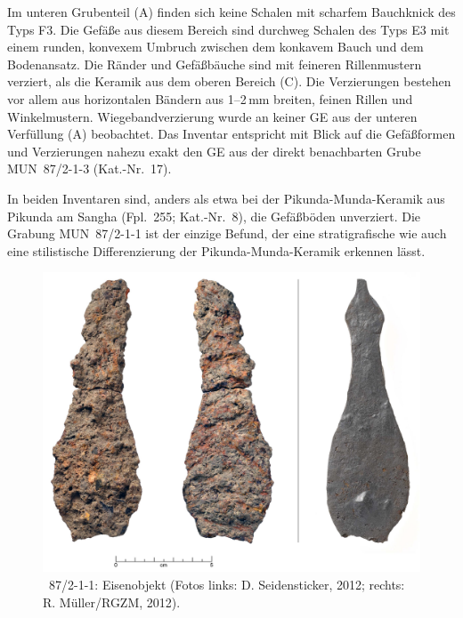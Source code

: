 Im unteren Grubenteil (A) finden sich keine Schalen mit scharfem Bauchknick des Typs F3. Die Gefäße aus diesem Bereich sind durchweg Schalen des Typs E3 mit einem runden, konvexem Umbruch zwischen dem konkavem Bauch und dem Bodenansatz. Die Ränder und Gefäßbäuche sind mit feineren Rillenmustern verziert, als die Keramik aus dem oberen Bereich (C). Die Verzierungen bestehen vor allem aus horizontalen Bändern aus 1--2\,mm breiten, feinen Rillen und Winkelmustern. Wiegebandverzierung wurde an keiner GE aus der unteren Verfüllung (A) beobachtet. Das Inventar entspricht mit Blick auf die Gefäßformen und Verzierungen nahezu exakt den GE aus der direkt benachbarten Grube MUN~87/2-1-3 (Kat.-Nr.~17).

In beiden Inventaren sind, anders als etwa bei der Pikunda-Munda-Keramik aus Pikunda am \mbox{Sangha} (Fpl.~255; Kat.-Nr.~8), die Gefäßböden unverziert. Die Grabung MUN~87/2-1-1 ist der einzige Befund, der eine stratigrafische wie auch eine stilistische Differenzierung der Pikunda-Munda-Keramik erkennen lässt.

\begin{figure}[p]
	\begin{minipage}[b]{.66\textwidth}
		\includegraphics[width = \textwidth]{fig/MUN87-211-2_Eisengeld.jpg}
	\end{minipage}\hfill
	\begin{minipage}[b]{.3\textwidth}
		\caption{~87/2-1-1: Eisenobjekt (Fotos links: D. Seidensticker, 2012; rechts: R. Müller/RGZM, 2012).}\label{fig:MUN87.2-1-1-2_Eisengeld_Foto}
	\end{minipage}
\end{figure}

